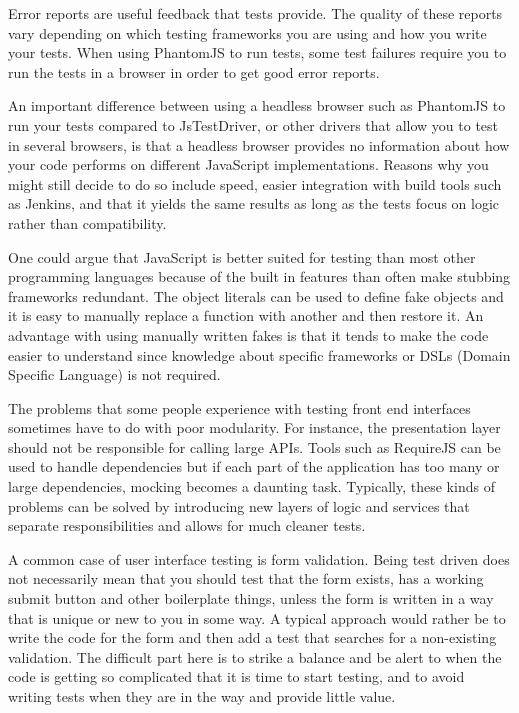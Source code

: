 \documentclass[11pt]{article}
\begin{document}
Error reports are useful feedback that tests provide. The quality of these reports vary depending on which testing frameworks you are using and how you write your tests. When using PhantomJS to run tests, some test failures require you to run the tests in a browser in order to get good error reports. \cite[question~12]{Edelstam}

An important difference between using a headless browser such as PhantomJS to run your tests compared to JsTestDriver, or other drivers that allow you to test in several browsers, is that a headless browser provides no information about how your code performs on different JavaScript implementations. Reasons why you might still decide to do so include speed, easier integration with build tools such as Jenkins, and that it yields the same results as long as the tests focus on logic rather than compatibility. \cite[questions~13-15]{Edelstam}


One could argue that JavaScript is better suited for testing than most other programming languages because of the built in features than often make stubbing frameworks redundant. The object literals can be used to define fake objects and it is easy to manually replace a function with another and then restore it. An advantage with using manually written fakes is that it tends to make the code easier to understand since knowledge about specific frameworks or DSLs (Domain Specific Language) is not required. \cite[questions~20-21]{Edelstam}\label{LiteralFakes}

The problems that some people experience with testing front end interfaces sometimes have to do with poor modularity. For instance, the presentation layer should not be responsible for calling large APIs. Tools such as RequireJS can be used to handle dependencies but if each part of the application has too many or large dependencies, mocking becomes a daunting task. Typically, these kinds of problems can be solved by introducing new layers of logic and services that separate responsibilities and allows for much cleaner tests. \cite[question~23]{Edelstam}

A common case of user interface testing is form validation. Being test driven does not necessarily mean that you should test that the form exists, has a working submit button and other boilerplate things, unless the form is written in a way that is unique or new to you in some way. A typical approach would rather be to write the code for the form and then add a test that searches for a non-existing validation. The difficult part here is to strike a balance and be alert to when the code is getting so complicated that it is time to start testing, and to avoid writing tests when they are in the way and provide little value. \cite[questions~24-25]{Edelstam}
\end{document}
